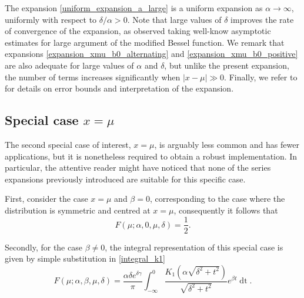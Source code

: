 \documentclass[10pt,a4paper,oneside]{article}
\numberwithin{equation}{section}
\begin{document}
The expansion \eqref{uniform_expansion_a_large} is a uniform expansion as $\alpha \to \infty$, uniformly with respect to $\delta / \alpha > 0$. Note that large values of $\delta$ improves the rate of convergence of the expansion, as observed taking well-know asymptotic estimates for large argument of the modified Bessel function. We remark that expansions \eqref{expansion_xmu_b0_alternating} and \eqref{expansion_xmu_b0_positive} are also adequate for large values of $\alpha$ and $\delta$, but unlike the present expansion, the number of terms increases significantly when $|x-\mu| \gg 0$. Finally, we refer to \cite[\S 3.2]{Temme1990c} for details on error bounds and interpretation of the expansion.

\subsection{Special case $x = \mu$}
The second special case of interest, $x = \mu$, is arguably less common and has fewer applications, but it is nonetheless required to obtain a robust implementation. In particular, the attentive reader might have noticed that none of the series expansions previously introduced are suitable for this specific case.

First, consider the case $x = \mu$ and $\beta = 0$, corresponding to the case where the distribution is symmetric and centred at $x = \mu$, consequently it follows that
\begin{equation}
F(\mu; \alpha, 0, \mu, \delta) = \frac{1}{2}.
\end{equation}

Secondly, for the case $\beta \neq 0$, the integral representation of this special case is given by simple substitution in \eqref{integral_k1}
\begin{equation}\label{integral_k1_x=mu}
F(\mu; \alpha, \beta, \mu, \delta) = \frac{\alpha \delta e^{\delta \gamma}}{\pi} \int_{-\infty}^{0} \frac{K_1\left(\alpha\sqrt{\delta^2 + t^2}\right)}{\sqrt{\delta^2 + t^2}} e^{\beta t} \mathop{dt}.
\end{equation}
\end{document}
